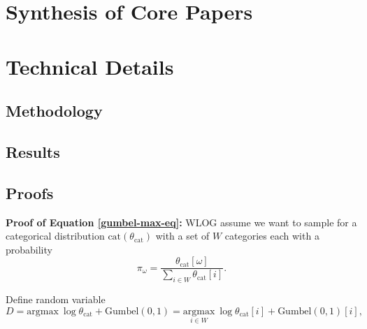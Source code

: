 \documentclass[
  11pt,
  letterpaper,
]{article}
\begin{document}
\hypertarget{synthesis-of-core-papers}{%
\section{Synthesis of Core Papers}\label{synthesis-of-core-papers}}

\hypertarget{technical-details}{%
\section{Technical Details}\label{technical-details}}

\hypertarget{methodology}{%
\subsection{Methodology}\label{methodology}}

\hypertarget{results}{%
\subsection{Results}\label{results}}

\hypertarget{sec-proof}{%
\subsection{Proofs}\label{sec-proof}}

\textbf{Proof of Equation \ref{gumbel-max-eq}:} WLOG assume we want to
sample for a categorical distribution \(\text{cat}(\theta_\text{cat})\)
with a set of \(W\) categories each with a probability \[
\pi_\omega = \dfrac{\theta_\text{cat}[\omega]}{\sum_{i \in W}\theta_\text{cat}[i]}.
\]

Define random variable \[
D = \text{argmax} \ \log \theta_\text{cat} + \text{Gumbel}(0, 1) = \underset{i \in W}{\text{argmax}} \ \log \theta_\text{cat}[i] + \text{Gumbel}(0, 1)[i], 
\]
\end{document}
